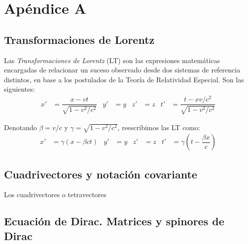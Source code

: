 \appendix
\chapter*{Apéndice A}\label{appendix}
\setcounter{section}{0}
\renewcommand{\thesection}{A.\arabic{section}}

\section{Transformaciones de Lorentz}\label{cap:Lorentz}
Las \textit{Transformaciones de Lorentz} (LT) son las expresiones matemáticas encargadas de relacionar un suceso observado desde dos sistemas de referencia distintos, en base a los postulados de la Teoría de Relatividad Especial. Son las siguientes:
\begin{align}
x' &= \dfrac{x-vt}{\sqrt{1-v^2/c^2}} & y' &=y & z' &=z & t' &=\dfrac{t-xv/c^2}{\sqrt{1-v^2/c^2}}\label{eq:TLorentz1}
\end{align}

Denotando $\beta=v/c$ y $\gamma=\sqrt{1-v^2/c^2}$, reescribimos las LT como:
\begin{align}
x' &= \gamma(x-\beta ct) & y' &=y & z' &=z & t' &=\gamma \left(t-\dfrac{\beta x}{c}\right) \label{eq:TLorentz2}
\end{align}

\section{Cuadrivectores y notación covariante}\label{cap:four-vectors}
\vspace{5mm}

Los cuadrivectores o tetravectores 

\section{Ecuación de Dirac. Matrices y spinores de Dirac}\label{cap:Dirac}